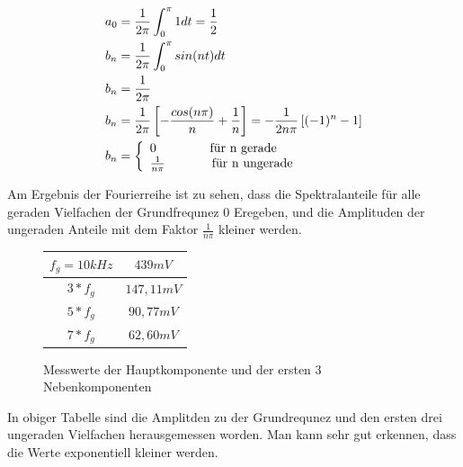 \begin{center}
  \begin{align*}
    a_0 &= \frac{1}{2\pi}\int_0^{\pi} 1 dt = \frac{1}{2} \\
    b_n &= \frac{1}{2\pi}\int_0^{\pi} sin(nt) dt \\
    b_n &= \frac{1}{2\pi} \\
    b_n &= \frac{1}{2\pi} \left[ -\frac{cos(n\pi)}{n} + \frac{1}{n} \right] = -\frac{1}{2n\pi} \left[ (-1)^n - 1  \right] \\
    b_n &= \left\{\begin{array}{ll}
            0              \hspace{1.5cm} \text{f\"ur n gerade}\\
            \frac{1}{n\pi} \hspace{1.3cm} \text{f\"ur n ungerade}
            \end{array}\right. \\
  \end{align*}
\end{center}
\noindent
Am Ergebnis der Fourierreihe ist zu sehen, dass die Spektralanteile f\"ur alle geraden Vielfachen der Grundfrequnez 0 Eregeben, und die Amplituden der ungeraden Anteile mit dem Faktor $\frac{1}{n\pi}$ kleiner werden.

\begin{figure}[H]
  \begin{center}
    \begin{tabular}{|c|c|} \hline
    $f_g=10kHz$ & $439mV$ \\ \hline
    $3*f_g$ & $147,11mV$ \\ \hline
    $5*f_g$ & $90,77mV$ \\ \hline
    $7*f_g$ & $62,60mV$ \\ \hline
    \end{tabular}
  \end{center}
  \caption{Messwerte der Hauptkomponente und der ersten 3 Nebenkomponenten}
\end{figure}
\noindent
In obiger Tabelle sind die Amplitden zu der Grundrequnez und den ersten drei ungeraden Vielfachen herausgemessen worden. Man kann sehr gut erkennen, dass die Werte exponentiell kleiner werden.
